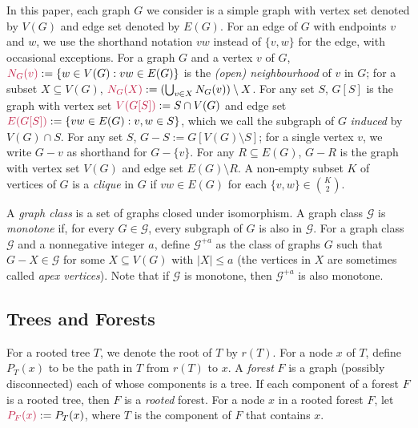 \documentclass{patmorin}
\makeatletter
\renewcommand{\leq}{\leqslant}
\newcommand{\defin}[1]{\emph{\textcolor{brightmaroon}{#1}}}
\def\mathcolor#1#{\@mathcolor{#1}}
\def\@mathcolor#1#2#3{%
  \protect\leavevmode
  \begingroup
    \color#1{#2}#3%
  \endgroup
}
\newcommand{\mathdefin}[1]{\mathcolor{brightmaroon}{#1}}
\newcommand{\calG}{\mathcal{G}}
\makeatother
\begin{document}
In this paper, each graph $G$ we consider is a simple graph with vertex set denoted by $V(G)$ and edge set denoted by $E(G)$. For an edge of $G$ with endpoints $v$ and $w$, we use the shorthand notation $vw$ instead of $\{v,w\}$ for the edge, with occasional exceptions.  For a graph $G$ and a vertex $v$ of $G$, $\mathdefin{N_G(v)}:=\{w\in V(G):vw\in E(G)\}$ is the \defin{(open) neighbourhood} of $v$ in $G$; for a subset $X\subseteq V(G)$, $\mathdefin{N_G(X)}:=(\bigcup_{v\in X}N_G(v))\setminus X$.  For any set $S$, \defin{$G[S]$} is the graph with vertex set $\mathdefin{V(G[S])}:=S\cap V(G)$ and edge set $\mathdefin{E(G[S])}:=\{vw\in E(G):v,w\in S\}$, which we call the subgraph of $G$ \defin{induced} by $V(G)\cap S$.  For any set $S$, $G-S:=G[V(G)\setminus S]$; for a single vertex $v$, we write $G-v$ as shorthand for $G-\{v\}$. For any $R\subseteq E(G)$, $G-R$ is the graph with vertex set $V(G)$ and edge set $E(G)\setminus R$. A non-empty subset $K$ of vertices of $G$ is a \defin{clique} in $G$ if $vw\in E(G)$ for each $\{v,w\}\in\binom{K}{2}$.  

A \defin{graph class} is a set of graphs closed under isomorphism. A graph class $\calG$ is \defin{monotone} if, for every $G\in\calG$, every subgraph of $G$ is also in $\calG$. For a graph class $\calG$ and a nonnegative integer $a$, define \defin{$\calG^{+a}$} as the class of graphs $G$ such that $G-X\in\calG$ for some $X\subseteq V(G)$ with $|X|\leq a$ (the vertices in $X$ are sometimes called \defin{apex vertices}). Note that if $\calG$ is monotone, then $\calG^{+a}$ is also monotone.

\subsection{Trees and Forests}

For a rooted tree $T$, we denote the root of $T$ by \defin{$r(T)$}. For a node $x$ of $T$, define \defin{$P_T(x)$} to be the path in $T$ from $r(T)$ to $x$.  A \defin{forest} $F$ is a graph (possibly disconnected) each of whose components is a tree.  If each component of a forest $F$ is a rooted tree, then $F$ is a \defin{rooted} forest. For a node $x$ in a rooted forest $F$, let $\mathdefin{P_F(x)}:=P_T(x)$, where $T$ is the component of $F$ that contains $x$.
\end{document}
